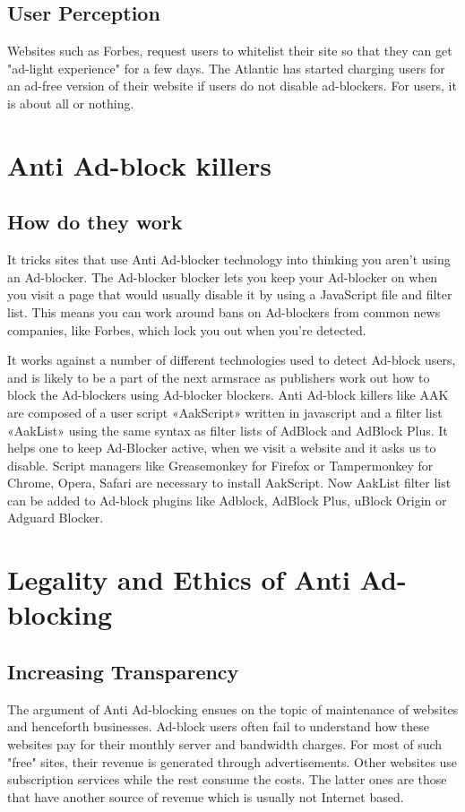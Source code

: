 \documentclass[runningheads,a4paper]{llncs}
\begin{document}
\subsection{User Perception}
Websites such as Forbes, request users to whitelist their site so that they can get "ad-light experience" for a few days. The Atlantic has started charging users for an ad-free version of their website if users do not disable ad-blockers. For users, it is about all or nothing.

\section{Anti Ad-block killers}
\subsection{How do they work} It tricks sites that use Anti Ad-blocker technology into thinking you aren’t using an Ad-blocker. The Ad-blocker blocker lets you keep your Ad-blocker on when you visit a page that would usually disable it by using a JavaScript file and filter list. This means you can work around bans on Ad-blockers from common news companies, like Forbes, which lock you out when you’re detected.

It works against a number of different technologies used to detect Ad-block users, and is likely to be a part of the next armsrace as publishers work out how to block the Ad-blockers using Ad-blocker blockers. 
Anti Ad-block killers like AAK \cite{AAK} are composed of a user script «AakScript» written in javascript and a filter list «AakList» using the same syntax as filter lists of AdBlock and AdBlock Plus. It helps one to keep Ad-Blocker active, when we visit a website and it asks us to disable. Script managers like Greasemonkey for Firefox or Tampermonkey for Chrome, Opera, Safari are necessary to install AakScript. Now AakList filter list can be added to Ad-block plugins like Adblock, AdBlock Plus, uBlock Origin or Adguard Blocker.

\section{Legality and Ethics of Anti Ad-blocking}
\subsection{Increasing Transparency}
The argument of Anti Ad-blocking ensues on the topic of maintenance of websites and henceforth businesses. Ad-block users often fail to understand how these websites pay for their monthly server and bandwidth charges. For most of such "free" sites, their revenue is generated through advertisements. Other websites use subscription services while the rest consume the costs. The latter ones are those that have another source of revenue which is usually not Internet based.
\end{document}
